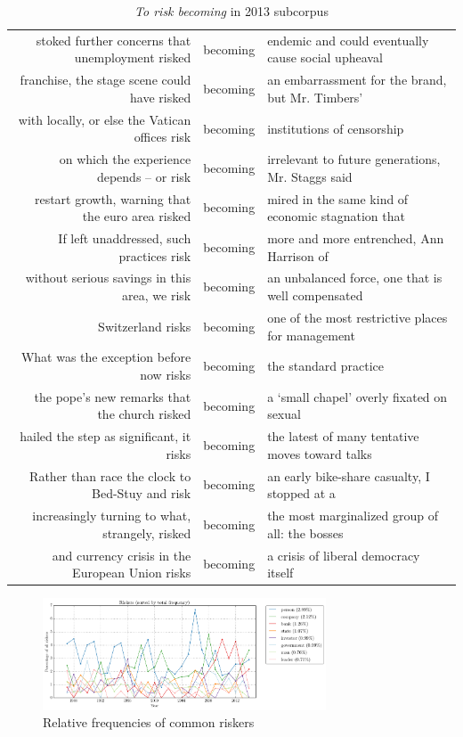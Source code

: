     \begin{table}
    \footnotesize
    \begin{tabular}{rcl}
    stoked further concerns that unemployment risked &  becoming &  endemic and could eventually cause social upheaval  \\ 
    franchise, the stage scene could have risked &  becoming &  an embarrassment for the brand, but Mr. Timbers'   \\ 
    with locally, or else the Vatican offices risk &  becoming &  institutions of censorship   \\ 
    on which the experience depends -- or risk &  becoming &  irrelevant to future generations, Mr. Staggs said   \\ 
    restart growth, warning that the euro area risked &  becoming &  mired in the same kind of economic stagnation that   \\ 
    If left unaddressed, such practices risk &  becoming &  more and more entrenched, Ann Harrison of   \\ 
    without serious savings in this area, we risk &  becoming &  an unbalanced force, one that is well compensated   \\ 
    Switzerland risks &  becoming &  one of the most restrictive places for management   \\ 
    What was the exception before now risks &  becoming &  the standard practice   \\ 
    the pope's new remarks that the church risked &  becoming &  a `small chapel' overly fixated on sexual   \\ 
    hailed the step as significant, it risks &  becoming &  the latest of many tentative moves toward talks   \\ 
    Rather than race the clock to Bed-Stuy and risk &  becoming &  an early bike-share casualty, I stopped at a   \\ 
    increasingly turning to what, strangely, risked &  becoming &  the most marginalized group of all: the bosses   \\ 
    and currency crisis in the European Union risks &  becoming &  a crisis of liberal democracy itself \\ 
    \end{tabular}
    \caption{\emph{To risk becoming} in 2013 subcorpus}
    \label{conc:riskbecoming}
    \end{table}

    \begin{figure}[htb!]
    \centering
    \includegraphics[width=0.75\textwidth]{../images/riskers-sorted-by-total-frequency.png}
    \caption{Relative frequencies of common riskers}
    \label{fig:riskers}
    \end{figure}


